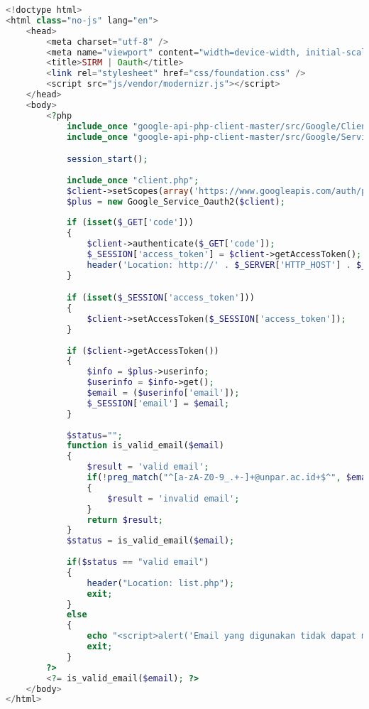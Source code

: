 \begin{lstlisting}[language=php,basicstyle=\tiny,caption=oauth.php]
<!doctype html>
<html class="no-js" lang="en">
	<head>
		<meta charset="utf-8" />
		<meta name="viewport" content="width=device-width, initial-scale=1.0" />
		<title>SIRM | Oauth</title>
		<link rel="stylesheet" href="css/foundation.css" />
		<script src="js/vendor/modernizr.js"></script>
	</head>
	<body>
		<?php
			include_once "google-api-php-client-master/src/Google/Client.php";
			include_once "google-api-php-client-master/src/Google/Service/Oauth2.php";

			session_start();
			
			include_once "client.php";
			$client->setScopes(array('https://www.googleapis.com/auth/plus.login','email'));
			$plus = new Google_Service_Oauth2($client);
			
			if (isset($_GET['code']))
			{
				$client->authenticate($_GET['code']);
				$_SESSION['access_token'] = $client->getAccessToken();
				header('Location: http://' . $_SERVER['HTTP_HOST'] . $_SERVER['PHP_SELF']);
			}

			if (isset($_SESSION['access_token']))
			{
				$client->setAccessToken($_SESSION['access_token']);
			}
			
			if ($client->getAccessToken()) 
			{
				$info = $plus->userinfo;
				$userinfo = $info->get();
				$email = ($userinfo['email']);
				$_SESSION['email'] = $email;
			}
			
			$status="";
			function is_valid_email($email)
			{
				$result = 'valid email';
				if(!preg_match("^[a-zA-Z0-9_.+-]+@unpar.ac.id+$^", $email) && !preg_match("^[a-zA-Z0-9_.+-]+@student.unpar.ac.id+$^", $email))
				{
					$result = 'invalid email';
				}
				return $result;
			}
			$status = is_valid_email($email);
			
			if($status == "valid email")
			{
				header("Location: list.php");
				exit;
			}
			else
			{
				echo "<script>alert('Email yang digunakan tidak dapat mengakses SIRM. Email yang dapat digunakan untuk mengakses SIRM adalah email yang diakhiri @unpar.ac.id atau @student.unpar.ac.id.');window.location.href='index.php?logout';</script>";
				exit;
			}
		?>
		<?= is_valid_email($email); ?>
	</body>
</html>
\end{lstlisting}

